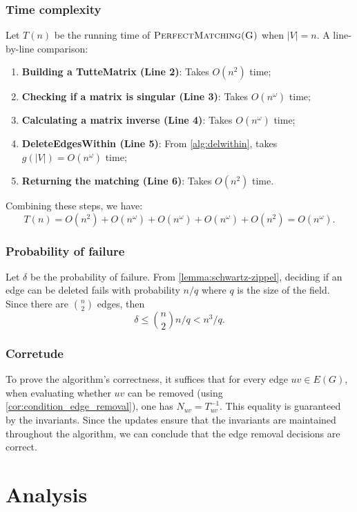 \subsubsection{Time complexity}
\noindent
Let \(T(n)\) be the running time of \(\textsc{PerfectMatching(G)}\) when \(|V| = n\). 
A line-by-line comparison:
\begin{enumerate}
  \item \textbf{Building a TutteMatrix (Line 2)}: Takes \(O(n^2)\) time;
  \item \textbf{Checking if a matrix is singular (Line 3)}: Takes \(O(n^\omega)\) time;
  \item \textbf{Calculating a matrix inverse (Line 4)}: Takes \(O(n^\omega)\) time;
  \item \textbf{DeleteEdgesWithin (Line 5)}: From \cref{alg:delwithin}, takes \(g(|V|) = O(n^\omega)\) time;
  \item \textbf{Returning the matching (Line 6)}: Takes \(O(n^2)\) time.
\end{enumerate}
Combining these steps, we have:
\begin{equation}
\label{alg:harvey_complexity}
    T(n) = O(n^2) + O(n^\omega) + O(n^\omega) + O(n^\omega) + O(n^2) = O(n^\omega).
\end{equation}

\subsubsection{Probability of failure}
\noindent
Let \(\delta\) be the probability of failure.
From \cref{lemma:schwartz-zippel}, deciding if an edge can be deleted fails with probability \(n / q\) where \(q\) is the size of the field. 
Since there are \(\binom{n}{2}\) edges, then 
\[
  \delta \leq \binom{n}{2} n / q < n^3 / q.
\]

\subsubsection{Corretude}
\noindent
To prove the algorithm's correctness, it suffices that for every edge \(uv \in E(G)\), when evaluating whether \(uv\) can be removed (using \cref{cor:condition_edge_removal}), one has \(N_{uv} = T^{-1}_{uv}\).
This equality is guaranteed by the invariants.
Since the updates ensure that the invariants are maintained throughout the algorithm, we can conclude that the edge removal decisions are correct.

\section{Analysis}
\label{Harvey:analysis}

